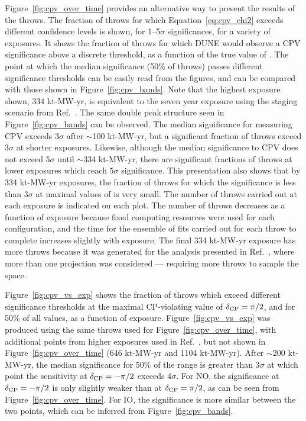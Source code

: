 Figure~\ref{fig:cpv_over_time} provides an alternative way to present the results of the throws. The fraction of throws for which Equation~\ref{eq:cpv_chi2} exceeds different confidence levels is shown, for 1--5$\sigma$ significances, for a variety of exposures. It shows the fraction of throws for which DUNE would observe a CPV significance above a discrete threshold, as a function of the true value of \deltacp. The point at which the median significance (50\% of throws) passes different significance thresholds can be easily read from the figures, and can be compared with those shown in Figure~\ref{fig:cpv_bands}. Note that the highest exposure shown, 334 kt-MW-yr, is equivalent to the seven year exposure using the staging scenario from Ref.~\cite{Abi:2020qib}. The same double peak structure seen in Figure~\ref{fig:cpv_bands} can be observed. The median significance for measuring CPV exceeds 3$\sigma$ after $\sim$100 kt-MW-yr, but a significant fraction of throws exceed 3$\sigma$ at shorter exposures. Likewise, although the median significance to CPV does not exceed 5$\sigma$ until $\sim$334 kt-MW-yr, there are significant fractions of throws at lower exposures which reach $5\sigma$ significance. This presentation also shows that by 334 kt-MW-yr exposures, the fraction of throws for which the significance is less than 3$\sigma$ at maximal values of \deltacp is very small. The number of throws carried out at each exposure is indicated on each plot. The number of throws decreases as a function of exposure because fixed computing resources were used for each configuration, and the time for the ensemble of fits carried out for each throw to complete increases slightly with exposure. The final 334 kt-MW-yr exposure has more throws because it was generated for the analysis presented in Ref.~\cite{Abi:2020qib}, where more than one projection was considered --- requiring more throws to sample the space.

Figure~\ref{fig:cpv_vs_exp} shows the fraction of throws which exceed different significance thresholds at the maximal CP-violating value of $\delta_{\rm CP} = \pi/2$, and for 50\% of all \deltacp values, as a function of exposure. Figure~\ref{fig:cpv_vs_exp} was produced using the same throws used for Figure~\ref{fig:cpv_over_time}, with additional points from higher exposures used in Ref.~\cite{Abi:2020qib}, but not shown in Figure~\ref{fig:cpv_over_time} (646 kt-MW-yr and 1104 kt-MW-yr). After $\sim$200 kt-MW-yr, the median significance for 50\% of the \deltacp range is greater than 3$\sigma$ at which point the sensitivity at $\delta_{\rm CP} = -\pi/2$ exceeds 4$\sigma$. For NO, the significance at $\delta_{\rm CP} = -\pi/2$ is only slightly weaker than at $\delta_{\rm CP} = \pi/2$, as can be seen from Figure~\ref{fig:cpv_over_time}. For IO, the significance is more similar between the two points, which can be inferred from Figure~\ref{fig:cpv_bands}.

